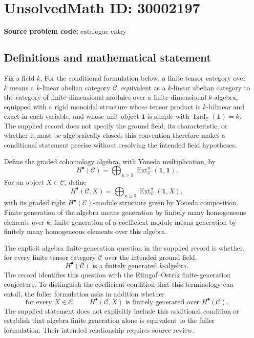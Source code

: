 \documentclass[11pt]{article}
\begin{document}
\section*{UnsolvedMath ID: 30002197}
\textbf{Source problem code:} catalogue entry
\subsection{Definitions and mathematical statement}
Fix a field \(k\). For the conditional formulation below, a finite tensor category over \(k\) means a \(k\)-linear abelian category \(\mathcal C\), equivalent as a \(k\)-linear abelian category to the category of finite-dimensional modules over a finite-dimensional \(k\)-algebra, equipped with a rigid monoidal structure whose tensor product is \(k\)-bilinear and exact in each variable, and whose unit object \(\mathbf 1\) is simple with \(\operatorname{End}_{\mathcal C}(\mathbf 1)=k\). The supplied record does not specify the ground field, its characteristic, or whether it must be algebraically closed; this convention therefore makes a conditional statement precise without resolving the intended field hypotheses.

Define the graded cohomology algebra, with Yoneda multiplication, by
\[
H^\bullet(\mathcal C)=\bigoplus_{n\geq 0}\operatorname{Ext}_{\mathcal C}^{n}(\mathbf 1,\mathbf 1).
\]
For an object \(X\in\mathcal C\), define
\[
H^\bullet(\mathcal C,X)=\bigoplus_{n\geq 0}\operatorname{Ext}_{\mathcal C}^{n}(\mathbf 1,X),
\]
with its graded right \(H^\bullet(\mathcal C)\)-module structure given by Yoneda composition. Finite generation of the algebra means generation by finitely many homogeneous elements over \(k\); finite generation of a coefficient module means generation by finitely many homogeneous elements over this algebra.

The explicit algebra finite-generation question in the supplied record is whether, for every finite tensor category \(\mathcal C\) over the intended ground field,
\[
H^\bullet(\mathcal C)\text{ is a finitely generated }k\text{-algebra}.
\]
The record identifies this question with the Etingof--Ostrik finite-generation conjecture. To distinguish the coefficient condition that this terminology can entail, the fuller formulation asks in addition whether
\[
\text{for every }X\in\mathcal C,\qquad H^\bullet(\mathcal C,X)\text{ is finitely generated over }H^\bullet(\mathcal C).
\]
The supplied statement does not explicitly include this additional condition or establish that algebra finite generation alone is equivalent to the fuller formulation. Their intended relationship requires source review.
\end{document}
